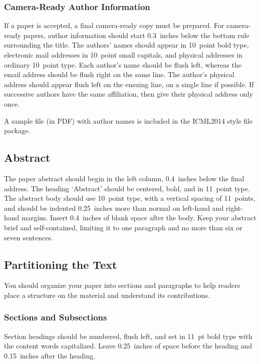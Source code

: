 \documentclass{article}
\begin{document}
\subsubsection{Camera-Ready Author Information}
\label{final author}

If a paper is accepted, a final camera-ready copy must be prepared.
%
For camera-ready papers, author information should start 0.3~inches
below the bottom rule surrounding the title. The authors' names should
appear in 10~point bold type, electronic mail addresses in 10~point
small capitals, and physical addresses in ordinary 10~point type.
Each author's name should be flush left, whereas the email address
should be flush right on the same line. The author's physical address
should appear flush left on the ensuing line, on a single line if
possible. If successive authors have the same affiliation, then give
their physical address only once.

A sample file (in PDF) with author names is included in the ICML2014 
style file package.

\subsection{Abstract}

The paper abstract should begin in the left column, 0.4~inches below
the final address. The heading `Abstract' should be centered, bold,
and in 11~point type. The abstract body should use 10~point type, with
a vertical spacing of 11~points, and should be indented 0.25~inches
more than normal on left-hand and right-hand margins. Insert
0.4~inches of blank space after the body. Keep your abstract brief and 
self-contained,
limiting it to one paragraph and no more than six or seven sentences.

\subsection{Partitioning the Text} 

You should organize your paper into sections and paragraphs to help
readers place a structure on the material and understand its
contributions.

\subsubsection{Sections and Subsections}

Section headings should be numbered, flush left, and set in 11~pt bold
type with the content words capitalized. Leave 0.25~inches of space
before the heading and 0.15~inches after the heading.
\end{document}
